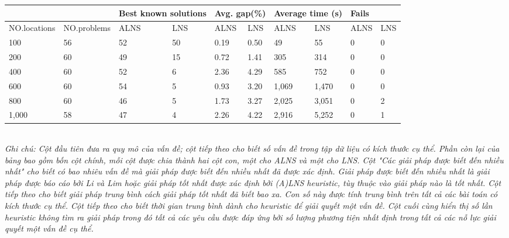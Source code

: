 \begin{table}[caption={Summary of Results Obtained on Li and Lim Instances (2001)}, label=tab:2]
    \begin{tabular}{@{}llllllllll@{}}
        \toprule
                    &           & \multicolumn{2}{l}{\footnotesize{Best known solutions}}& \multicolumn{2}{l}{\footnotesize{Avg. gap(\%)}}& \multicolumn{2}{l}{\footnotesize{Average time (s)}}& \multicolumn{2}{l}{\footnotesize{Fails}} \\ 
        \hline            
        \footnotesize{NO.locations}&\scriptsize{NO.problems}&\footnotesize{ALNS}&\footnotesize{LNS}&\footnotesize{ALNS}&\footnotesize{LNS}&\footnotesize{ALNS}&\footnotesize{LNS}&\footnotesize{ALNS}&\footnotesize{LNS}\\ \midrule
        100 & 56 & 52 & 50 & 0.19 & 0.50 & 49 & 55 & 0 & 0 \\
        200 &60 &49 &15&0.72&1.41&305&314&0&0 \\
        400 &60 &52 &6&2.36&4.29&585&752&0&0 \\ 
        600 &60 &54 &5&0.93&3.20&1,069&1,470&0&0 \\
        800 &60 &46 &5&1.73&3.27&2,025&3,051&0&2 \\
        1,000 &58 &47 &4 &2.26 &4.22 &2,916 &5,252 &0 &1 \\ \bottomrule
        \end{tabular} \\
        \justify
        \textit{Ghi chú: Cột đầu tiên đưa ra quy mô của vấn đề; cột tiếp theo cho biết số vấn đề trong tập dữ liệu có kích thước cụ thể. Phần còn lại của bảng bao gồm bốn cột chính, mỗi cột được chia thành hai cột con, một cho ALNS và một cho LNS. Cột "Các giải pháp được biết đến nhiều nhất" cho biết có bao nhiêu vấn đề mà giải pháp được biết đến nhiều nhất đã được xác định. Giải pháp được biết đến nhiều nhất là giải pháp được báo cáo bởi Li và Lim hoặc giải pháp tốt nhất được xác định bởi (A)LNS heuristic, tùy thuộc vào giải pháp nào là tốt nhất. Cột tiếp theo cho biết giải pháp trung bình cách giải pháp tốt nhất đã biết bao xa. Con số này được tính trung bình trên tất cả các bài toán có kích thước cụ thể. Cột tiếp theo cho biết thời gian trung bình dành cho heuristic để giải quyết một vấn đề. Cột cuối cùng hiển thị số lần heuristic không tìm ra giải pháp trong đó tất cả các yêu cầu được đáp ứng bởi số lượng phương tiện nhất định trong tất cả các nỗ lực giải quyết một vấn đề cụ thể.}
\end{table}

